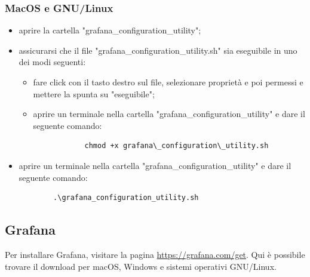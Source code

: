 	\subsubsection{MacOS e GNU/Linux}
	\begin{itemize}
		\item aprire la cartella "grafana\_configuration\_utility";
		\item assicurarsi che il file "grafana\_configuration\_utility.sh" sia eseguibile in uno dei modi seguenti:
		\begin{itemize}
			\item fare click con il tasto destro sul file, selezionare proprietà e poi permessi e mettere la spunta su "eseguibile";
			\item aprire un terminale nella cartella "grafana\_configuration\_utility" e dare il seguente comando: 
			\begin{verbatim}
			chmod +x grafana\_configuration\_utility.sh
			\end{verbatim}
		\end{itemize}
		\item aprire un terminale nella cartella "grafana\_configuration\_utility" e dare il seguente comando:
		\begin{verbatim}
	    .\grafana_configuration_utility.sh
		\end{verbatim}
	\end{itemize}
\subsection{Grafana}
Per installare Grafana\glo, visitare la pagina \url{https://grafana.com/get}. Qui è possibile trovare il download per macOS, Windows e sistemi operativi GNU/Linux.
